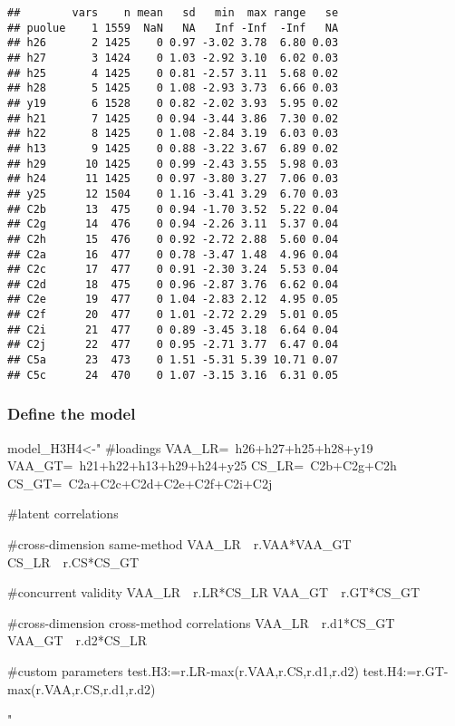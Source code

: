 \documentclass[
]{article}
\newenvironment{Shaded}{\begin{snugshade}}{\end{snugshade}}
\newcommand{\NormalTok}[1]{#1}
\newcommand{\StringTok}[1]{\textcolor[rgb]{0.31,0.60,0.02}{#1}}
\begin{document}
\begin{verbatim}
##        vars    n mean   sd   min  max range   se
## puolue    1 1559  NaN   NA   Inf -Inf  -Inf   NA
## h26       2 1425    0 0.97 -3.02 3.78  6.80 0.03
## h27       3 1424    0 1.03 -2.92 3.10  6.02 0.03
## h25       4 1425    0 0.81 -2.57 3.11  5.68 0.02
## h28       5 1425    0 1.08 -2.93 3.73  6.66 0.03
## y19       6 1528    0 0.82 -2.02 3.93  5.95 0.02
## h21       7 1425    0 0.94 -3.44 3.86  7.30 0.02
## h22       8 1425    0 1.08 -2.84 3.19  6.03 0.03
## h13       9 1425    0 0.88 -3.22 3.67  6.89 0.02
## h29      10 1425    0 0.99 -2.43 3.55  5.98 0.03
## h24      11 1425    0 0.97 -3.80 3.27  7.06 0.03
## y25      12 1504    0 1.16 -3.41 3.29  6.70 0.03
## C2b      13  475    0 0.94 -1.70 3.52  5.22 0.04
## C2g      14  476    0 0.94 -2.26 3.11  5.37 0.04
## C2h      15  476    0 0.92 -2.72 2.88  5.60 0.04
## C2a      16  477    0 0.78 -3.47 1.48  4.96 0.04
## C2c      17  477    0 0.91 -2.30 3.24  5.53 0.04
## C2d      18  475    0 0.96 -2.87 3.76  6.62 0.04
## C2e      19  477    0 1.04 -2.83 2.12  4.95 0.05
## C2f      20  477    0 1.01 -2.72 2.29  5.01 0.05
## C2i      21  477    0 0.89 -3.45 3.18  6.64 0.04
## C2j      22  477    0 0.95 -2.71 3.77  6.47 0.04
## C5a      23  473    0 1.51 -5.31 5.39 10.71 0.07
## C5c      24  470    0 1.07 -3.15 3.16  6.31 0.05
\end{verbatim}

\hypertarget{define-the-model-2}{%
\subsubsection{Define the model}\label{define-the-model-2}}

\begin{Shaded}
\begin{Highlighting}[]
\NormalTok{model_H3H4<-}\StringTok{"}
\StringTok{#loadings}
\StringTok{VAA_LR=~h26+h27+h25+h28+y19}
\StringTok{VAA_GT=~h21+h22+h13+h29+h24+y25}
\StringTok{CS_LR=~C2b+C2g+C2h}
\StringTok{CS_GT=~C2a+C2c+C2d+C2e+C2f+C2i+C2j}

\StringTok{#latent correlations}

\StringTok{#cross-dimension same-method}
\StringTok{VAA_LR~~r.VAA*VAA_GT}
\StringTok{CS_LR~~r.CS*CS_GT}

\StringTok{#concurrent validity}
\StringTok{VAA_LR~~r.LR*CS_LR}
\StringTok{VAA_GT~~r.GT*CS_GT}

\StringTok{#cross-dimension cross-method correlations}
\StringTok{VAA_LR~~r.d1*CS_GT}
\StringTok{VAA_GT~~r.d2*CS_LR}

\StringTok{#custom parameters}
\StringTok{test.H3:=r.LR-max(r.VAA,r.CS,r.d1,r.d2)}
\StringTok{test.H4:=r.GT-max(r.VAA,r.CS,r.d1,r.d2)}

\StringTok{"}
\end{Highlighting}
\end{Shaded}
\end{document}
